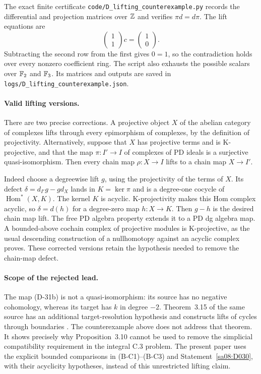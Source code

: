 The exact finite certificate
\texttt{code/D\_lifting\_counterexample.py}
records the differential and projection matrices over
\(\mathbb Z\) and verifies \(\pi d=d\pi\).
The lift equations are
\[
 \begin{pmatrix}1\\1\end{pmatrix}c
       =\begin{pmatrix}1\\0\end{pmatrix}.
\]
Subtracting the second row from the first gives
\(0=1\), so the contradiction holds over every nonzero
coefficient ring. The script also exhausts the possible
scalars over \(\mathbb F_2\) and \(\mathbb F_3\). Its matrices and
outputs are saved in
\texttt{logs/D\_lifting\_counterexample.json}.

\paragraph{Valid lifting versions.}
There are two precise corrections. A projective object
\(X\) of the abelian category of complexes lifts through
every epimorphism of complexes, by the definition of
projectivity. Alternatively, suppose that \(X\) has
projective terms and is K-projective, and that the map
\(\pi:I'\to I\) of complexes of PD ideals is a
surjective quasi-isomorphism. Then every chain map
\(\rho:X\to I\) lifts to a chain map \(X\to I'\).

Indeed choose a degreewise lift \(g\), using the
projectivity of the terms of \(X\). Its defect
\(\delta=d_{I'}g-gd_X\) lands in \(K=\ker\pi\)
and is a degree-one cocycle of
\(\operatorname{Hom}^*(X,K)\). The kernel \(K\) is
acyclic. K-projectivity makes this Hom complex
acyclic, so \(\delta=d(h)\) for a degree-zero map
\(h:X\to K\). Then \(g-h\) is the desired chain
map lift. The free PD algebra property extends it
to a PD dg algebra map. A bounded-above cochain
complex of projective modules is K-projective, as
the usual descending construction of a nullhomotopy
against an acyclic complex proves. These corrected
versions retain the hypothesis needed to remove
the chain-map defect.

\paragraph{Scope of the rejected lead.}
The map (D-31b) is not a quasi-isomorphism: its source
has no negative cohomology, whereas its target has
\(k\) in degree \(-2\). Theorem~3.15 of the same
source has an additional target-resolution hypothesis
and constructs lifts of cycles through boundaries
\cite[Theorem~3.15, pp.~23--25]{D_CaradotLin2026}.
The counterexample above does not address that theorem.
It shows precisely why Proposition~3.10 cannot be
used to remove the simplicial compatibility requirement
in the integral C.3 problem. The present paper uses
the explicit bounded comparisons in (B-C1)--(B-C3)
and Statement~\ref{sa08:D030}, with their acyclicity
hypotheses, instead of this unrestricted lifting claim.
